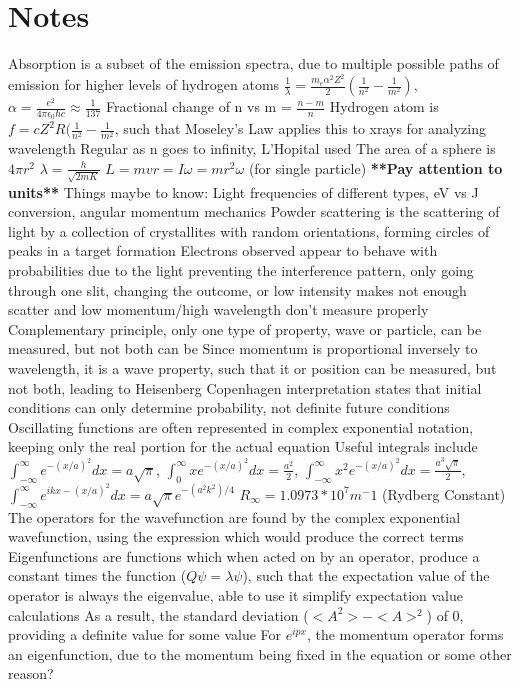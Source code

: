 \documentclass[11 pt, twoside]{article}
\newenvironment{outline*}
{
	\begin{outline}[enumerate]
	}
	{\end{outline}
}
\begin{document}
\section{Notes}
\begin{outline*}
\1 Absorption is a subset of the emission spectra, due to multiple possible paths of emission for higher levels of hydrogen atoms
\1 $\frac{1}{\lambda} = \frac{m_e \alpha^2 Z^2}{2} (\frac{1}{n^2} - \frac{1}{m^2})$, $\alpha = \frac{e^2}{4\pi \epsilon_0 \hbar c} \approx \frac{1}{137}$
\1 Fractional change of n vs m = $\frac{n - m}{n}$
\1 Hydrogen atom is $f = cZ^2R(\frac{1}{n^2} - \frac{1}{m^2}$, such that Moseley's Law applies this to xrays for analyzing wavelength
\1 Regular as n goes to infinity, L'Hopital used 
\1 The area of a sphere is $4\pi r^2$
\1 $\lambda = \frac{h}{\sqrt{2mK}}$
\1 $L = mvr = I\omega = mr^2 \omega$ (for single particle)
\1 \textbf{**Pay attention to units**}
\1 Things maybe to know: Light frequencies of different types, eV vs J conversion, angular momentum mechanics
\1 Powder scattering is the scattering of light by a collection of crystallites with random orientations, forming circles of peaks in a target formation
\1 Electrons observed appear to behave with probabilities due to the light preventing the interference pattern, only going through one slit, changing the outcome, or low intensity makes not enough scatter and low momentum/high wavelength don't measure properly
	\2 Complementary principle, only one type of property, wave or particle, can be measured, but not both can be
		\3 Since momentum is proportional inversely to wavelength, it is a wave property, such that it or position can be measured, but not both, leading to Heisenberg
\1 Copenhagen interpretation states that initial conditions can only determine probability, not definite future conditions
\1 Oscillating functions are often represented in complex exponential notation, keeping only the real portion for the actual equation
\1 Useful integrals include $\int^{\infty}_{-\infty} e^{-(x/a)^2}dx = a\sqrt{\pi}$, $\int^{\infty}_{0} xe^{-(x/a)^2}dx = \frac{a^2}{2}$, $\int^{\infty}_{-\infty} x^2 e^{-(x/a)^2}dx = \frac{a^3\sqrt{\pi}}{2}$, $\int^{\infty}_{-\infty} e^{ikx-(x/a)^2}dx = a\sqrt{\pi}e^{-(a^2k^2)/4}$
\1 $R_{\infty} = 1.0973 * 10^7 m^-1$ (Rydberg Constant)
\1 The operators for the wavefunction are found by the complex exponential wavefunction, using the expression which would produce the correct terms
	\2 Eigenfunctions are functions which when acted on by an operator, produce a constant times the function ($Q\psi = \lambda \psi$), such that the expectation value of the operator is always the eigenvalue, able to use it simplify expectation value calculations
	\2 As a result, the standard deviation ($<A^2> - <A>^2$) of 0, providing a definite value for some value
	\2 For $e^{ipx}$, the momentum operator forms an eigenfunction, due to the momentum being fixed in the equation or some other reason?
\end{outline*}
\end{document}
